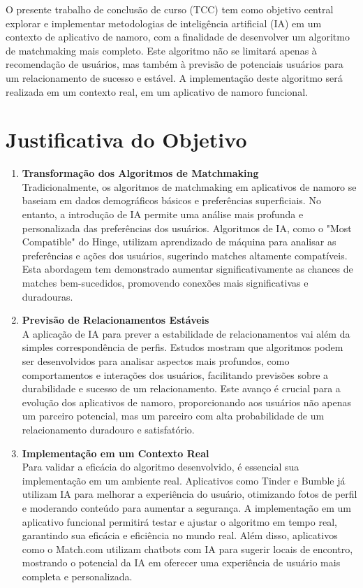 O presente trabalho de conclusão de curso (TCC) tem como objetivo central explorar e implementar metodologias de inteligência artificial (IA) em um contexto de aplicativo de namoro, com a finalidade de desenvolver um algoritmo de matchmaking mais completo. Este algoritmo não se limitará apenas à recomendação de usuários, mas também à previsão de potenciais usuários para um relacionamento de sucesso e estável. A implementação deste algoritmo será realizada em um contexto real, em um aplicativo de namoro funcional.

\section*{Justificativa do Objetivo}

\begin{enumerate}[label=\arabic*.]
    \item \textbf{Transformação dos Algoritmos de Matchmaking}\\
    Tradicionalmente, os algoritmos de matchmaking em aplicativos de namoro se baseiam em dados demográficos básicos e preferências superficiais. No entanto, a introdução de IA permite uma análise mais profunda e personalizada das preferências dos usuários. Algoritmos de IA, como o "Most Compatible" do Hinge, utilizam aprendizado de máquina para analisar as preferências e ações dos usuários, sugerindo matches altamente compatíveis. Esta abordagem tem demonstrado aumentar significativamente as chances de matches bem-sucedidos, promovendo conexões mais significativas e duradouras.

    \item \textbf{Previsão de Relacionamentos Estáveis}\\
    A aplicação de IA para prever a estabilidade de relacionamentos vai além da simples correspondência de perfis. Estudos mostram que algoritmos podem ser desenvolvidos para analisar aspectos mais profundos, como comportamentos e interações dos usuários, facilitando previsões sobre a durabilidade e sucesso de um relacionamento. Este avanço é crucial para a evolução dos aplicativos de namoro, proporcionando aos usuários não apenas um parceiro potencial, mas um parceiro com alta probabilidade de um relacionamento duradouro e satisfatório.

    \item \textbf{Implementação em um Contexto Real}\\
    Para validar a eficácia do algoritmo desenvolvido, é essencial sua implementação em um ambiente real. Aplicativos como Tinder e Bumble já utilizam IA para melhorar a experiência do usuário, otimizando fotos de perfil e moderando conteúdo para aumentar a segurança. A implementação em um aplicativo funcional permitirá testar e ajustar o algoritmo em tempo real, garantindo sua eficácia e eficiência no mundo real. Além disso, aplicativos como o Match.com utilizam chatbots com IA para sugerir locais de encontro, mostrando o potencial da IA em oferecer uma experiência de usuário mais completa e personalizada.
\end{enumerate}